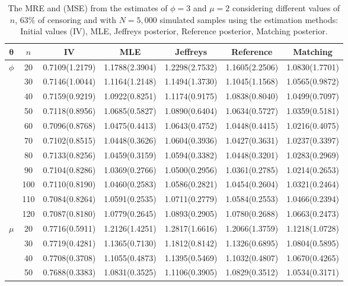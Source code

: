 \documentclass[]{interact}
\theoremstyle{plain}%
\theoremstyle{definition}
\theoremstyle{remark}
\begin{document}
\begin{table}[!h]
\centering
\caption{The MRE and (MSE) from the estimates of $\phi=3$ and $\mu=2$ considering different values of $n$, $63\%$ of censoring and with $N=5,000$ simulated samples using the estimation methods: Initial values (IV),  MLE, Jeffreys posterior, Reference posterior,  Matching posterior.}
{\small
\begin{tabular}{c|c|c|c|c|c|c}
\hline
$\boldsymbol{\theta}$ & $n$ & IV & MLE & Jeffreys  & Reference  & Matching  \\
\hline
\multirow{11}{*}{$\phi$} 
&  20 & 0.7109(1.2179) & 1.1788(2.3904) & 1.2298(2.7532) & 1.1605(2.2506) & 1.0830(1.7701) \\
&  30 & 0.7146(1.0044) & 1.1164(1.2148) & 1.1494(1.3730) & 1.1045(1.1568) & 1.0565(0.9872) \\
&  40 & 0.7159(0.9219) & 1.0922(0.8251) & 1.1174(0.9175) & 1.0838(0.8040) & 1.0499(0.7097) \\
&  50 & 0.7118(0.8956) & 1.0685(0.5827) & 1.0890(0.6404) & 1.0634(0.5727) & 1.0359(0.5181) \\
&  60 & 0.7096(0.8768) & 1.0475(0.4413) & 1.0643(0.4752) & 1.0448(0.4415) & 1.0216(0.4075) \\
&  70 & 0.7102(0.8515) & 1.0448(0.3626) & 1.0604(0.3936) & 1.0427(0.3631) & 1.0237(0.3397) \\
&  80 & 0.7133(0.8256) & 1.0459(0.3159) & 1.0594(0.3382) & 1.0448(0.3201) & 1.0283(0.2969) \\
&  90 & 0.7104(0.8286) & 1.0369(0.2766) & 1.0500(0.2956) & 1.0361(0.2785) & 1.0214(0.2653) \\
&  100 & 0.7110(0.8190) & 1.0460(0.2583) & 1.0586(0.2821) & 1.0454(0.2604) & 1.0321(0.2464) \\
&  110 & 0.7084(0.8264) & 1.0591(0.2535) & 1.0711(0.2779) & 1.0584(0.2553) & 1.0466(0.2394) \\
&  120 & 0.7087(0.8180) & 1.0779(0.2645) & 1.0893(0.2905) & 1.0780(0.2688) & 1.0663(0.2473) \\
\hline
\multirow{11}{*}{$\mu$} 
&  20 & 0.7716(0.5911) & 1.2126(1.4251) & 1.2817(1.6616) & 1.2066(1.3759) & 1.1218(1.0728) \\
&  30 & 0.7719(0.4281) & 1.1365(0.7130) & 1.1812(0.8142) & 1.1326(0.6895) & 1.0804(0.5895) \\
&  40 & 0.7708(0.3708) & 1.1055(0.4873) & 1.1395(0.5469) & 1.1032(0.4807) & 1.0670(0.4265) \\
&  50 & 0.7688(0.3383) & 1.0831(0.3525) & 1.1106(0.3905) & 1.0829(0.3512) & 1.0534(0.3171) \\

\end{tabular}}
\end{table}
\end{document}
